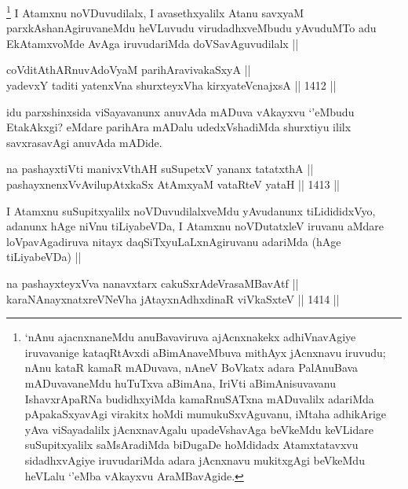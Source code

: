 \begin{artha}
\footnote{`nAnu ajacnxnaneMdu anuBavaviruva ajAcnxnakekx adhiVnavAgiye iruvavanige kataqRtAvxdi aBimAnaveMbuva mithAyx jAcnxnavu iruvudu; nAnu kataR kamaR mADuvava, nAneV BoVkatx adara PalAnuBava mADuvavaneMdu huTuTxva aBimAna, IriVti aBimAnisuvavanu IshavxrApaRNa budidhxyiMda kamaRnuSATxna mADuvalilx adariMda pApakaSxyavAgi virakitx hoMdi mumukuSxvAguvanu, iMtaha adhikArige yAva viSayadalilx jAcnxnavAgalu upadeVshavAga beVkeMdu keVLidare suSupitxyalilx saMsAradiMda biDugaDe hoMdidadx Atamxtatavxvu sidadhxvAgiye iruvudariMda adara jAcnxnavu mukitxgAgi beVkeMdu heVLalu `\stext'eMba vAkayxvu AraMBavAgide.}
I Atamxnu noVDuvudilalx, I avasethxyalilx Atanu savxyaM parxkAshanAgiruvaneMdu heVLuvudu virudadhxveMbudu yAvuduMTo adu EkAtamxvoMde AvAga iruvudariMda doVSavAguvudilalx ||
\end{artha}

\begin{shl}
coVditAthARnuvAdoV\s yaM parihAravivakaSxyA || \\
yadevxY taditi yatenxVna shurxteyxVha kirxyateV\s cnajxsA \hfill || 1412 ||  
\end{shl}

\begin{artha}
idu parxshinxsida viSayavanunx anuvAda mADuva vAkayxvu `\stext'eMbudu EtakAkxgi? eMdare parihAra mADalu udedxVshadiMda shurxtiyu ililx savxrasavAgi anuvAda mADide.
\end{artha}


\begin{shl}
na pashayxtiVti manivxVthAH suSupetxV yananx tatatxthA ||  \\
pashayxnenxVvAvilupAtxkaSx AtAmx\s yaM vataRteV yataH \hfill || 1413 ||  
\end{shl}

\begin{artha}
I Atamxnu suSupitxyalilx noVDuvudilalxveMdu yAvudanunx tiLidididxVyo, adanunx hAge niVnu tiLiyabeVDa, I Atamxnu noVDutatxleV iruvanu aMdare loVpavAgadiruva nitayx daqSiTxyuLaLxnAgiruvanu adariMda (hAge tiLiyabeVDa) ||
\end{artha}

 
\begin{shl}
na pashayxteyxVva nanavxtarx cakuSxrAdeVrasaMBavAtf || \\
karaNAnayxnatxreVNeVha jAtayxnAdhxdinaR viVkaSxteV \hfill || 1414 ||  
\end{shl}
 
